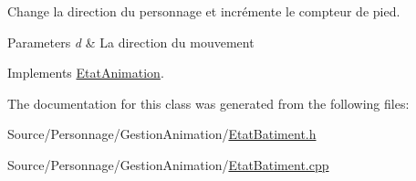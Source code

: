 Change la direction du personnage et incrémente le compteur de pied. 


\begin{DoxyParams}{Parameters}
{\em d} & La direction du mouvement \\
\hline
\end{DoxyParams}


Implements \hyperlink{classEtatAnimation_a09e0277b2679249f33e6b95047cb9378}{Etat\-Animation}.



The documentation for this class was generated from the following files\-:\begin{DoxyCompactItemize}
\item 
Source/\-Personnage/\-Gestion\-Animation/\hyperlink{EtatBatiment_8h}{Etat\-Batiment.\-h}\item 
Source/\-Personnage/\-Gestion\-Animation/\hyperlink{EtatBatiment_8cpp}{Etat\-Batiment.\-cpp}\end{DoxyCompactItemize}
